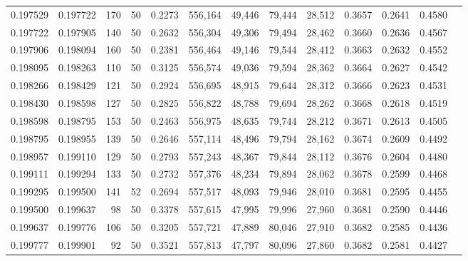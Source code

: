 \begin{tabular}{rrrrrrrrrrrrr}
0.197529 & 0.197722 &   170 &  50 &                                     0.2273 & 556,164 &  49,446 &  79,444 &  28,512 & 0.3657 & 0.2641 & 0.4580 \\
0.197722 & 0.197905 &   140 &  50 &                                     0.2632 & 556,304 &  49,306 &  79,494 &  28,462 & 0.3660 & 0.2636 & 0.4567 \\
0.197906 & 0.198094 &   160 &  50 &                                     0.2381 & 556,464 &  49,146 &  79,544 &  28,412 & 0.3663 & 0.2632 & 0.4552 \\
0.198095 & 0.198263 &   110 &  50 &                                     0.3125 & 556,574 &  49,036 &  79,594 &  28,362 & 0.3664 & 0.2627 & 0.4542 \\
0.198266 & 0.198429 &   121 &  50 &                                     0.2924 & 556,695 &  48,915 &  79,644 &  28,312 & 0.3666 & 0.2623 & 0.4531 \\
0.198430 & 0.198598 &   127 &  50 &                                     0.2825 & 556,822 &  48,788 &  79,694 &  28,262 & 0.3668 & 0.2618 & 0.4519 \\
0.198598 & 0.198795 &   153 &  50 &                                     0.2463 & 556,975 &  48,635 &  79,744 &  28,212 & 0.3671 & 0.2613 & 0.4505 \\
0.198795 & 0.198955 &   139 &  50 &                                     0.2646 & 557,114 &  48,496 &  79,794 &  28,162 & 0.3674 & 0.2609 & 0.4492 \\
0.198957 & 0.199110 &   129 &  50 &                                     0.2793 & 557,243 &  48,367 &  79,844 &  28,112 & 0.3676 & 0.2604 & 0.4480 \\
0.199111 & 0.199294 &   133 &  50 &                                     0.2732 & 557,376 &  48,234 &  79,894 &  28,062 & 0.3678 & 0.2599 & 0.4468 \\
0.199295 & 0.199500 &   141 &  52 &                                     0.2694 & 557,517 &  48,093 &  79,946 &  28,010 & 0.3681 & 0.2595 & 0.4455 \\
0.199500 & 0.199637 &    98 &  50 &                                     0.3378 & 557,615 &  47,995 &  79,996 &  27,960 & 0.3681 & 0.2590 & 0.4446 \\
0.199637 & 0.199776 &   106 &  50 &                                     0.3205 & 557,721 &  47,889 &  80,046 &  27,910 & 0.3682 & 0.2585 & 0.4436 \\
0.199777 & 0.199901 &    92 &  50 &                                     0.3521 & 557,813 &  47,797 &  80,096 &  27,860 & 0.3682 & 0.2581 & 0.4427 \\

\end{tabular}
